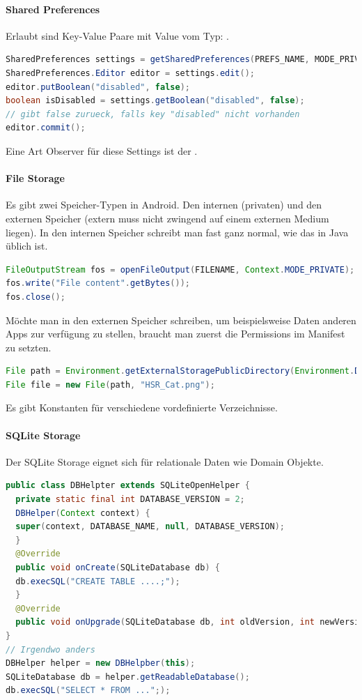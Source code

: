 \paragraph{Shared Preferences} Erlaubt sind Key-Value Paare mit Value vom Typ: . 
\begin{lstlisting}[language=java]
SharedPreferences settings = getSharedPreferences(PREFS_NAME, MODE_PRIVATE);
SharedPreferences.Editor editor = settings.edit();
editor.putBoolean("disabled", false);
boolean isDisabled = settings.getBoolean("disabled", false);
// gibt false zurueck, falls key "disabled" nicht vorhanden
editor.commit();
\end{lstlisting}
Eine Art Observer für diese Settings ist der .
\paragraph{File Storage} Es gibt zwei Speicher-Typen in Android. Den internen (privaten) und den externen Speicher (extern muss nicht zwingend auf einem externen Medium liegen). In den internen Speicher schreibt man fast ganz normal, wie das in Java üblich ist.
\begin{lstlisting}[language=java]
FileOutputStream fos = openFileOutput(FILENAME, Context.MODE_PRIVATE);
fos.write("File content".getBytes());
fos.close();
\end{lstlisting}
Möchte man in den externen Speicher schreiben, um beispielsweise Daten anderen Apps zur verfügung zu stellen, braucht man zuerst die Permissions im Manifest zu setzten. 
\begin{lstlisting}[language=java]
File path = Environment.getExternalStoragePublicDirectory(Environment.DIRECTORY_PICTURES);
File file = new File(path, "HSR_Cat.png");
\end{lstlisting}
Es gibt Konstanten für verschiedene vordefinierte Verzeichnisse.
\paragraph{SQLite Storage} Der SQLite Storage eignet sich für relationale Daten wie Domain Objekte.
\begin{lstlisting}[language=java]
public class DBHelpter extends SQLiteOpenHelper {
  private static final int DATABASE_VERSION = 2;
  DBHelper(Context context) {
  super(context, DATABASE_NAME, null, DATABASE_VERSION);
  }
  @Override
  public void onCreate(SQLiteDatabase db) {
  db.execSQL("CREATE TABLE ....;");
  }
  @Override
  public void onUpgrade(SQLiteDatabase db, int oldVersion, int newVersion {}
}
// Irgendwo anders
DBHelper helper = new DBHelpber(this);
SQLiteDatabase db = helper.getReadableDatabase();
db.execSQL("SELECT * FROM ...";);
\end{lstlisting}

